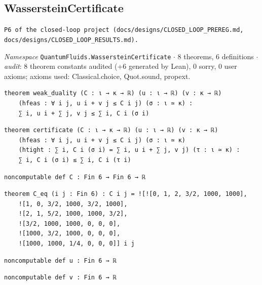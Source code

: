 \subsection{WassersteinCertificate}\label{appA:WassersteinCertificate}
{\footnotesize\raggedright\texttt{P6 of the closed-\allowbreak{}loop project (docs/\allowbreak{}designs/\allowbreak{}CLOSED\_\allowbreak{}LOOP\_\allowbreak{}PREREG.\allowbreak{}md,\allowbreak{} docs/\allowbreak{}designs/\allowbreak{}CLOSED\_\allowbreak{}LOOP\_\allowbreak{}RESULTS.\allowbreak{}md).\allowbreak{}}\par}
{\footnotesize\raggedright\emph{Namespace} \texttt{QuantumFluids.\allowbreak{}WassersteinCertificate} $\cdot$ 8 theorems, 6 definitions $\cdot$ \emph{audit}: 8 theorem constants audited (+6 generated by Lean), 0 sorry, 0 user axioms; axioms used: Classical.choice, Quot.sound, propext.\par}
\vspace{1pt}
\begin{lstlisting}[style=leancat]
theorem weak_duality (C : ι → κ → ℝ) (u : ι → ℝ) (v : κ → ℝ)
    (hfeas : ∀ i j, u i + v j ≤ C i j) (σ : ι ≃ κ) :
    ∑ i, u i + ∑ j, v j ≤ ∑ i, C i (σ i)
\end{lstlisting}

\begin{lstlisting}[style=leancat]
theorem certificate (C : ι → κ → ℝ) (u : ι → ℝ) (v : κ → ℝ)
    (hfeas : ∀ i j, u i + v j ≤ C i j) (σ : ι ≃ κ)
    (htight : ∑ i, C i (σ i) = ∑ i, u i + ∑ j, v j) (τ : ι ≃ κ) :
    ∑ i, C i (σ i) ≤ ∑ i, C i (τ i)
\end{lstlisting}

\begin{lstlisting}[style=leancat]
noncomputable def C : Fin 6 → Fin 6 → ℝ
\end{lstlisting}

\begin{lstlisting}[style=leancat]
theorem C_eq (i j : Fin 6) : C i j = ![![0, 1, 2, 3/2, 1000, 1000],
    ![1, 0, 3/2, 1000, 3/2, 1000],
    ![2, 1, 5/2, 1000, 1000, 3/2],
    ![3/2, 1000, 1000, 0, 0, 0],
    ![1000, 3/2, 1000, 0, 0, 0],
    ![1000, 1000, 1/4, 0, 0, 0]] i j
\end{lstlisting}

\begin{lstlisting}[style=leancat]
noncomputable def u : Fin 6 → ℝ
\end{lstlisting}

\begin{lstlisting}[style=leancat]
noncomputable def v : Fin 6 → ℝ
\end{lstlisting}

